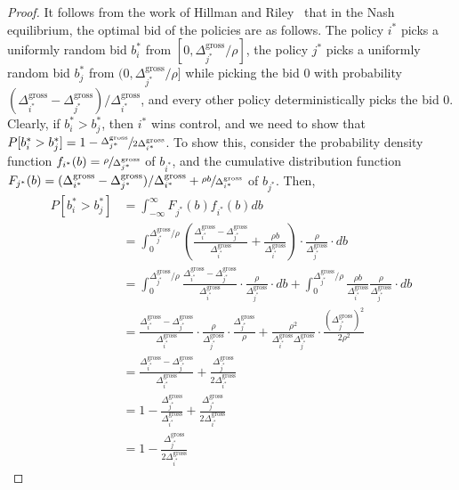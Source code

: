 \begin{proof}
	It follows from the work of Hillman and Riley~\cite{hillman1989politically} that in the Nash equilibrium, the optimal bid of the policies are as follows.
	The policy $i^*$ picks a uniformly random bid $b_i^*$ from $[0,\Delta_{j^*}^{\mathrm{gross}}/\rho]$, the policy $j^*$ picks a uniformly random bid $b_j^*$ from $(0,\Delta_{j^*}^{\mathrm{gross}}/\rho]$ while picking the bid $0$ with probability $(\Delta_{i^*}^{\mathrm{gross}} - \Delta_{j^*}^{\mathrm{gross}})/\Delta_{i^*}^{\mathrm{gross}}$, and every other policy deterministically picks the bid $0$.
	Clearly, if $b_i^*>b_j^*$, then $i^*$ wins control, and we need to show that $P[b_i^* > b_j^*]  = 1- \sfrac{\Delta_{j^*}^{\mathrm{gross}}}{2\Delta_{i^*}^{\mathrm{gross}}}$.
	To show this, consider the probability density function $f_{i^*}(b) = \sfrac{\rho }{\Delta_{j^*}^{\mathrm{gross}}}$ of $b_{i^*}$, and the cumulative distribution function $F_{j^*}(b) = (\Delta_{i^*}^{\mathrm{gross}} - \Delta_{j^*}^{\mathrm{gross}})/\Delta_{i^*}^{\mathrm{gross}} + \sfrac{\rho b}{\Delta_{i^*}^{\mathrm{gross}}}$ of $b_{j^*}$.
	Then,
	\begin{align*}
		P[b_i^* > b_j^*] 
		&= \int_{-\infty}^\infty F_{j^*}(b)f_{i^*}(b)db\\
		&= \int_{0}^{\Delta_{j^*}^{\mathrm{gross}}/\rho} \left(\frac{\Delta_{i^*}^{\mathrm{gross}} - \Delta_{j^*}^{\mathrm{gross}}}{\Delta_{i^*}^{\mathrm{gross}}} + \frac{\rho b}{\Delta_{i^*}^{\mathrm{gross}}}\right)\cdot \frac{\rho }{\Delta_{j^*}^{\mathrm{gross}}} \cdot db \\
		&= \int_{0}^{\Delta_{j^*}^{\mathrm{gross}}/\rho} \frac{\Delta_{i^*}^{\mathrm{gross}} - \Delta_{j^*}^{\mathrm{gross}}}{\Delta_{i^*}^{\mathrm{gross}}} \cdot \frac{\rho }{\Delta_{j^*}^{\mathrm{gross}}} \cdot db
		+ \int_{0}^{\Delta_{j^*}^{\mathrm{gross}}/\rho} \frac{\rho b}{\Delta_{i^*}^{\mathrm{gross}}}\frac{\rho }{\Delta_{j^*}^{\mathrm{gross}}} \cdot db\\
		&=  \frac{\Delta_{i^*}^{\mathrm{gross}} - \Delta_{j^*}^{\mathrm{gross}}}{\Delta_{i^*}^{\mathrm{gross}}} \cdot \frac{\rho }{\Delta_{j^*}^{\mathrm{gross}}} \cdot \frac{\Delta_{j^*}^{\mathrm{gross}}}{\rho}
		+ \frac{\rho^2}{\Delta_{i^*}^{\mathrm{gross}}\Delta_{j^*}^{\mathrm{gross}}}\cdot \frac{\left(\Delta_{j^*}^{\mathrm{gross}}\right)^2}{2\rho^2}\\
		&= \frac{\Delta_{i^*}^{\mathrm{gross}} - \Delta_{j^*}^{\mathrm{gross}}}{\Delta_{i^*}^{\mathrm{gross}}} + \frac{\Delta_{j^*}^{\mathrm{gross}}}{2\Delta_{i^*}^{\mathrm{gross}}}\\
		&= 1-\frac{\Delta_{j^*}^{\mathrm{gross}}}{\Delta_{i^*}^{\mathrm{gross}}} + \frac{\Delta_{j^*}^{\mathrm{gross}}}{2\Delta_{i^*}^{\mathrm{gross}}}\\
		&= 1-\frac{\Delta_{j^*}^{\mathrm{gross}}}{2\Delta_{i^*}^{\mathrm{gross}}}
	\end{align*}
\end{proof}

